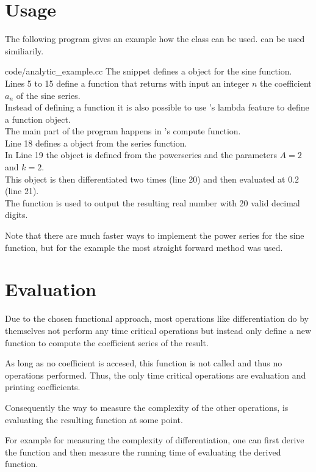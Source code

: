 	\section{Usage}
		The following \cc program gives an example how the \baana class can be used. 
    \anarect can be used similiarily.
    
    {code/analytic_example.cc}
   The snippet defines a \baana object for the sine function.\\ 
   Lines 5 to 15 define a function that returns with input an integer $n$ the coefficient $a_n$ of the sine series.\\
   Instead of defining a function it is also possible to use {\ccx}'s lambda feature to define a function object. \\
   The main part of the program happens in {\irram}'s compute function. \\
   Line 18 defines a \powerseries object from the series function. \\
   In Line 19 the \baana object is defined from the powerseries and the parameters $A=2$ and $k=2$.\\
   This object is then differentiated two times (line 20) and then evaluated at $0.2$ (line 21). \\
   The  function is used to output the resulting real number with 20 valid decimal digits.

   Note that there are much faster ways to implement the power series for the sine function, but for the example
   the most straight forward method was used.

	\section{Evaluation}
		Due to the chosen functional approach, most operations like differentiation do by themselves not perform any time critical operations 
    but instead only define a new function to compute the coefficient series of the result.
    
		As long as no coefficient is accesed, this function is not called and thus no operations performed.
		Thus, the only time critical operations are evaluation and printing coefficients.

		Consequently the way to measure the complexity of the other operations, is evaluating the resulting function at some point.

		For example for measuring the complexity of differentiation, one can  first derive the function and then measure the running time 
    of evaluating the derived function.

